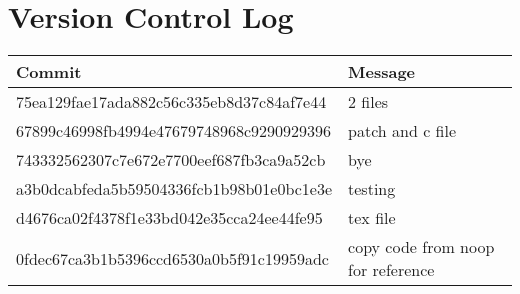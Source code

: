 \documentclass[letterpaper,10pt,draftclsnofoot,titlepage,onecolumn]{IEEEtran}
\begin{document}
	\section{Version Control Log}
	
\begin{center}

 \begin{tabular}{|  m{5cm} | m{3cm} | } 
\hline
 Commit &Message \\ [0.5ex] 
 \hline\hline
 75ea129fae17ada882c56c335eb8d37c84af7e44 & 2 files\\
\hline
 67899c46998fb4994e47679748968c9290929396 & patch and c file\\
 743332562307c7e672e7700eef687fb3ca9a52cb & bye\\
\hline
 a3b0dcabfeda5b59504336fcb1b98b01e0bc1e3e & testing\\
\hline
 d4676ca02f4378f1e33bd042e35cca24ee44fe95 & tex file\\
\hline
 0fdec67ca3b1b5396ccd6530a0b5f91c19959adc & copy code from noop for reference\\
  
\hline
\end{tabular}
\end{center}
	
\clearpage
\end{document}
